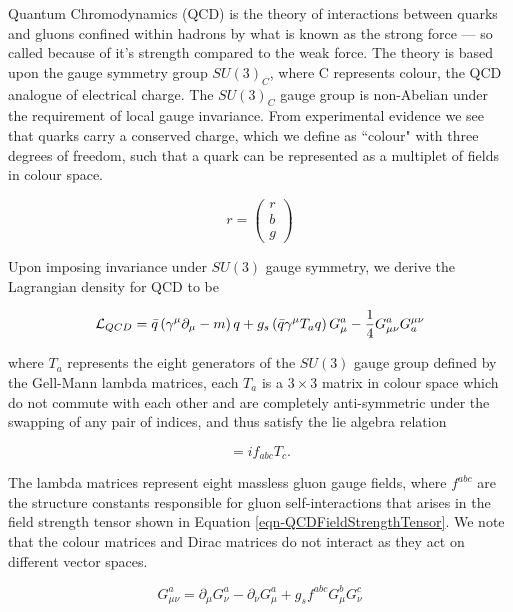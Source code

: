 Quantum Chromodynamics (QCD) is the theory of interactions between quarks and gluons confined within hadrons by what is known as the strong force --- so called because of it's strength compared to the weak force. The theory is based upon the gauge symmetry group $SU(3)_C$, where C represents colour, the QCD analogue of electrical charge. The $SU(3)_C$ gauge group is non-Abelian under the requirement of local gauge invariance. From experimental evidence we see that quarks carry a conserved charge, which we define as ``colour" with three degrees of freedom, such that a quark can be represented as a multiplet of fields in colour space. 

\begin{equation}
r = 
\begin{pmatrix}
r \\
b \\
g
\end{pmatrix}
\end{equation}

Upon imposing invariance under $SU(3)$ gauge symmetry, we derive the Lagrangian density for QCD to be

\begin{equation}
\mathcal{L}_{QCD} = \bar{q}\left(\gamma^{\mu}\partial_{\mu} - m \right) q + g_s \left( \bar{q}\gamma^{\mu}T_a q \right) G^a_{\mu} - \frac{1}{4}G^a_{\mu \nu}G^{\mu \nu}_a
\end{equation}

where $T_a$ represents the eight generators of the $SU(3)$ gauge group defined by the Gell-Mann lambda matrices, each $T_a$ is a $3 \times 3$ matrix in colour space which do not commute with each other and are completely anti-symmetric under the swapping of any pair of indices, and thus satisfy the lie algebra relation  

\begin{equation}
[T_a, T_b] = if_{abc}T_c.
\end{equation}

The lambda matrices represent eight massless gluon gauge fields, where $f^{abc}$ are the structure constants responsible for gluon self-interactions that arises in the field strength tensor shown in Equation \ref{eqn-QCDFieldStrengthTensor}. We note that the colour matrices and Dirac matrices do not interact as they act on different vector spaces. 

\begin{equation} \label{eqn-QCDFieldStrengthTensor}
G^a_{\mu \nu} = \partial_{\mu}G^a_{\nu} - \partial_{\nu}G^a_{\mu} + g_s f^{abc}G^b_{\mu}G^c_{\nu}
\end{equation}

